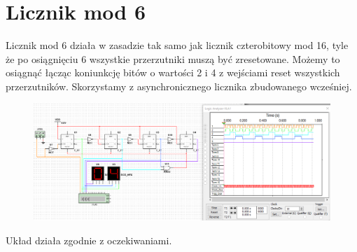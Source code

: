 \documentclass[12pt,a4paper]{article}
\begin{document}
\section{Licznik mod 6}
Licznik mod 6 działa w zasadzie tak samo jak licznik czterobitowy mod 16, tyle że po osiągnięciu 6 wszystkie przerzutniki muszą być zresetowane. Możemy to osiągnąć łącząc koniunkcję bitów o wartości 2 i 4 z wejściami reset wszystkich przerzutników. Skorzystamy z asynchronicznego licznika zbudowanego wcześniej.

\begin{figure}[H]
\centering
\includegraphics[width=\textwidth]{img/4d_circuit}
\end{figure}

Układ działa zgodnie z oczekiwaniami.
\end{document}
